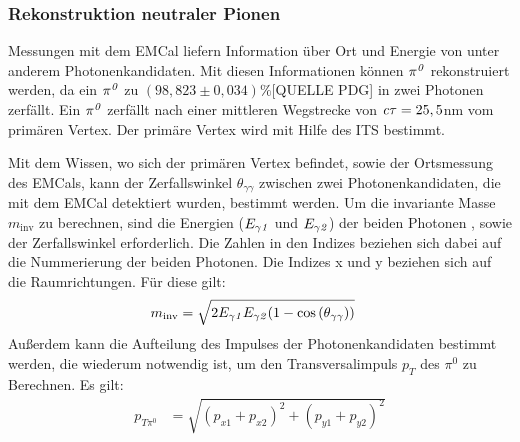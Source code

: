 \documentclass[11pt]{article}
\begin{document}
	\subsubsection{Rekonstruktion neutraler Pionen}

	Messungen mit dem EMCal liefern Information {\"u}ber Ort und Energie von unter anderem Photonenkandidaten. Mit diesen Informationen k{\"o}nnen ${\it \pi^{0}}$ rekonstruiert werden, da ein ${\it \pi^{0}}$ zu $\left( 98,823\pm0,034\right)\%$[QUELLE PDG] in zwei Photonen zerf{\"a}llt. Ein ${\it \pi^{0}}$ zerf{\"a}llt nach einer mittleren Wegstrecke von ${\it c\tau} = 25,5$nm vom prim{\"a}ren Vertex. Der prim{\"a}re Vertex wird mit Hilfe des ITS bestimmt.

	Mit dem Wissen, wo sich der prim{\"a}ren Vertex befindet, sowie der Ortsmessung des EMCals, kann der Zerfallswinkel $\theta_{\gamma\gamma}$ zwischen zwei Photonenkandidaten, die mit dem EMCal detektiert wurden, bestimmt werden.
	Um die invariante Masse $m_{\text{inv}}$ zu berechnen, sind die Energien ($E_{\gamma\it{1}}$ und $E_{\gamma\it{2}}$) der beiden Photonen , sowie der Zerfallswinkel erforderlich.
	Die Zahlen in den Indizes beziehen sich dabei auf die Nummerierung der beiden Photonen. Die Indizes x und y beziehen sich auf die Raumrichtungen. F{\"u}r diese gilt:
	\begin{align}
	\label{eq_invmass}
	m_{\text{inv}} &= \sqrt{2E_{\gamma\it{1}}E_{\gamma\it{2}}(1-\cos\left( \theta_{\gamma\gamma}\right) )}
	\end{align}
	Au{\ss}erdem kann die Aufteilung des Impulses der Photonenkandidaten bestimmt werden, die wiederum notwendig ist, um den Transversalimpuls $p_{T}$ des $\pi^{0}$ zu Berechnen.
	Es gilt:
	\begin{align}
	\label{eq_pt}
	p_{T\pi^{0}} &= \sqrt{\left(p_{x1}+p_{x2}\right)^{2} +\left(p_{y1}+p_{y2}\right)^{2}}
	\end{align}
\end{document}
